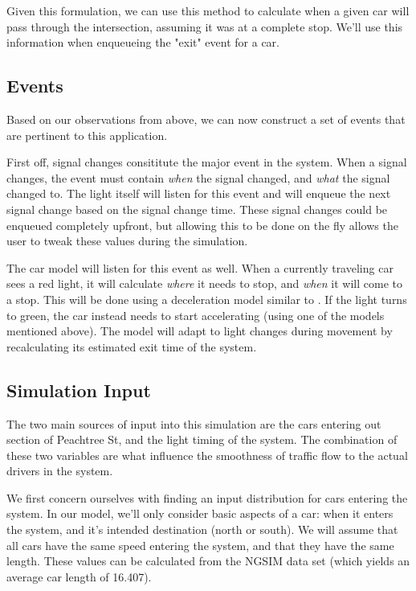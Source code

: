 \documentclass[a4paper,12pt]{article}
\begin{document}
Given this formulation, we can use this method to calculate when a given car will pass through the intersection,
assuming it was at a complete stop. We'll use this information when enqueueing the "exit" event for a car.

\subsection{Events}
Based on our observations from above, we can now construct a set of events that are pertinent to this application.

First off, signal changes consititute the major event in the system. When a signal changes, the event must contain
\emph{when} the signal changed, and \emph{what} the signal changed to. The light itself will listen for this event
and will enqueue the next signal change based on the signal change time. These signal changes could be enqueued
completely upfront, but allowing this to be done on the fly allows the user to tweak these values during the simulation.

The car model will listen for this event as well. When a currently traveling car sees a red light, it will calculate
\emph{where} it needs to stop, and \emph{when} it will come to a stop. This will be done using a deceleration model
similar to \cite{deceleration}. If the light turns to green, the car instead needs to start accelerating (using one of
the models mentioned above). The model will adapt to light changes during movement by recalculating its estimated
exit time of the system.

\subsection{Simulation Input}
The two main sources of input into this simulation are the cars entering out section of Peachtree St, and the light
timing of the system. The combination of these two variables are what influence the smoothness
of traffic flow to the actual drivers in the system.

We first concern ourselves with finding an input distribution for cars entering the system. In our model, we'll only
consider basic aspects of a car: when it enters the system, and it's intended destination (north or south). We will assume that all cars have the same speed entering the system, and that they
have the same length. These values can be calculated from the NGSIM data set \cite{ngsim} (which yields an average car length of 16.407).
\end{document}
